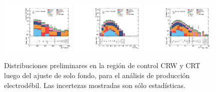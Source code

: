 \begin{figure}[ht!]
    \includegraphics[width=0.32\textwidth]{images/analysis_EWK/v192_2_nosyst/can_CRT_met_et_afterFit.pdf}
    \includegraphics[width=0.32\textwidth]{images/analysis_EWK/v192_2_nosyst/can_CRT_met_etmeff_afterFit.pdf}
    \includegraphics[width=0.32\textwidth]{images/analysis_EWK/v192_2_nosyst/can_CRT_met_sig_obj_afterFit.pdf}

    \caption{Distribuciones preliminares en la región de control CRW y CRT luego del ajuste de solo fondo, para el análisis de producción electrodébil. Las incertezas mostradas son sólo estadísticas.}
    \label{fig:crw_crt_dist_ewk}

\end{figure}


